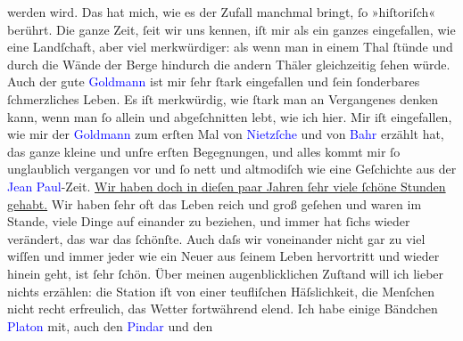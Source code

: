                     werden wird. Das hat mich, wie es der Zufall manchmal bringt, ſo »hiſtoriſch«
                    berührt. Die ganze Zeit, ſeit wir uns kennen, iſt mir als ein ganzes
                    eingefallen, wie eine Landſchaft, {\pb}aber viel merkwürdiger: als
                    wenn man in einem Thal ſtünde und durch die Wände der Berge hindurch die andern
                    Thäler gleichzeitig ſehen würde.\pend
           \pstart
           Auch der gute \textcolor{blue}{Goldmann}{}\ledrightnote{\textcolor{blue}{Paul Goldmann}} ist mir ſehr ſtark
                    eingefallen und ſein ſonderbares ſchmerzliches Leben. Es iſt merkwürdig, wie
                    ſtark man an Vergangenes denken kann, wenn man ſo allein und abgeſchnitten lebt,
                    wie ich hier. Mir iſt eingefallen, wie mir der \textcolor{blue}{Goldmann}{}\ledrightnote{\textcolor{blue}{Paul Goldmann}} zum erſten Mal von \textcolor{blue}{Nietzſche}{}\ledrightnote{\textcolor{blue}{Friedrich Nietzsche}} und von \textcolor{blue}{Bahr}{}\ledrightnote{\textcolor{blue}{Hermann Bahr}} erzählt
                    hat, das ganze kleine \label{K_L00545_2v}\label{K_L00545_2h} und unſre {\pb}erſten Begegnungen, und
                    alles kommt mir ſo unglaublich vergangen vor und ſo nett und altmodiſch wie eine
                    Geſchichte aus der \textcolor{blue}{Jean Paul}{}\ledrightnote{\textcolor{blue}{Jean Paul}}-Zeit. \uline{Wir haben doch in dieſen paar Jahren ſehr viele
                        ſchöne Stunden gehabt.} Wir haben ſehr oft das Leben reich und groß
                    geſehen und waren im Stande, viele Dinge auf einander zu beziehen, und immer hat
                    ſichs wieder verändert, das war das ſchönſte. \label{LL435-1v}Auch daſs wir voneinander nicht gar zu viel wiſſen und
                        immer  jeder {\pb}wie ein Neuer aus ſeinem
                        Leben hervortritt und wieder hinein geht, ist ſehr ſchön.\label{LL435-1h}\pend
           \pstart
           Über meinen augenblicklichen Zuſtand will ich lieber nichts erzählen: die Station
                    iſt von einer teufliſchen Häſslichkeit, die Menſchen nicht recht erfreulich, das
                    Wetter fortwährend elend. Ich habe einige Bändchen \textcolor{blue}{Platon}{}\ledrightnote{\textcolor{blue}{Platon}} mit, auch den \textcolor{blue}{Pindar}{}\ledrightnote{\textcolor{blue}{Pindaros}} und den
